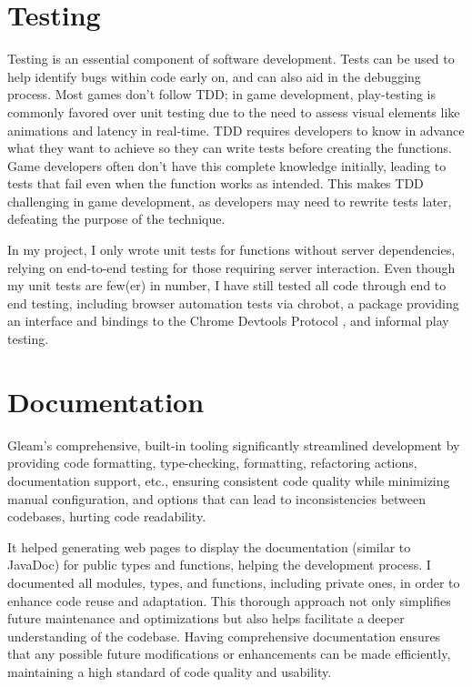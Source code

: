 \documentclass[]{final}
\begin{document}
\section{Testing}
Testing is an essential component of software development. Tests can be used to
help identify bugs within code early on, and can also aid in the debugging process.
Most games don't follow TDD; in game development, play-testing is commonly favored
over unit testing due to the need to assess visual elements like animations and
latency in real-time.\cite{politowski_survey_2021} TDD requires developers to know
in advance what they want to
achieve so they can write tests before creating the functions. Game developers often don't
have this complete knowledge initially, leading to tests that fail even when the function
works as intended. This makes TDD challenging in game development, as developers may
need to rewrite tests later, defeating the purpose of the technique.

In my project, I only wrote unit tests for functions without server
dependencies, relying on end-to-end testing for those requiring server interaction.
Even though my unit tests are few(er) in number, I have still tested all code through
end to end testing, including browser automation tests via chrobot, a package providing
an interface and bindings to the Chrome Devtools Protocol \cite{noauthor_chrobot_nodate},
and informal play testing.

\section{Documentation}
Gleam's comprehensive, built-in tooling significantly streamlined development by
providing code formatting, type-checking, formatting, refactoring actions, documentation support, etc.,
ensuring consistent code quality while minimizing manual configuration, and
options that can lead to inconsistencies between codebases, hurting code
readability.

It helped generating web pages to display the documentation (similar to JavaDoc)
for public types and functions, helping the development process.
I documented all modules, types, and functions, including private ones,
in order to enhance code reuse and adaptation. This thorough approach not
only simplifies future maintenance and optimizations but also helps facilitate a
deeper understanding of the codebase.
Having comprehensive documentation
ensures that any possible future modifications or enhancements can be made
efficiently, maintaining a high standard of code quality and usability.
\end{document}
